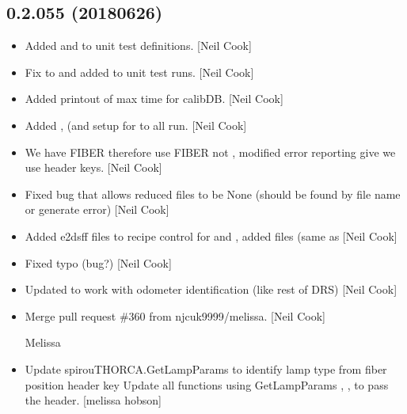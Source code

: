 \documentclass[a4paper,10pt,english]{report}
\begin{document}
\subsection{0.2.055 (2018\sphinxhyphen{}06\sphinxhyphen{}26)}
\label{\detokenize{misc/changelog:id428}}\begin{itemize}
\item {} 
Added  and  to unit test definitions. {[}Neil Cook{]}

\item {} 
Fix to  and  added to unit test runs. {[}Neil Cook{]}

\item {} 
Added printout of max time for calibDB. {[}Neil Cook{]}

\item {} 
Added ,  (and setup for  to all run. {[}Neil
Cook{]}

\item {} 
We have FIBER therefore use FIBER not , modified error
reporting give we use header keys. {[}Neil Cook{]}

\item {} 
Fixed bug that allows reduced files to be None (should be found by
file name or generate error) {[}Neil Cook{]}

\item {} 
Added e2dsff files to recipe control for  and , added
 files (same as  {[}Neil Cook{]}

\item {} 
Fixed typo (bug?) {[}Neil Cook{]}

\item {} 
Updated to work with odometer identification (like rest of DRS) {[}Neil
Cook{]}

\item {} 
Merge pull request \#360 from njcuk9999/melissa. {[}Neil Cook{]}

Melissa

\item {} 
Update spirouTHORCA.GetLampParams to identify lamp type from fiber
position header key Update all functions using GetLampParams ,
,   to pass the header. {[}melissa\sphinxhyphen{}
hobson{]}


\end{itemize}
\end{document}
